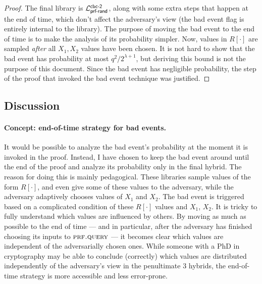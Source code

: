 \documentclass[11pt,letterpaper]{article}
\newcommand{\lib}[1]{\mathcal{L}_{\textsf{\textup{#1}}}}
\newcommand{\secpar}{\lambda}
\newcommand{\subname}[1]{\textsc{#1}}
\newcommand{\prfquery}{\subname{prf.query}}
\newcommand{\hybproof}[1]{}
\begin{document}
\begin{proof}
\hybproof{cbc-mac}

    The final library is $\lib{prf-rand}^{\textsf{cbc-2}}$, along with some extra steps that happen at the end of time, which don't affect the adversary's view (the bad event flag is entirely internal to the library).
    The purpose of moving the bad event to the end of time is to make the analysis of its probability simpler.
    Now, values in $R[\cdot]$ are sampled \emph{after} all $X_1, X_2$ values have been chosen.
    It is not hard to show that the bad event has probability at most $q^2 / 2^{\secpar+1}$, but deriving this bound is not the purpose of this document.
    Since the bad event has negligible probability, the step of the proof that invoked the bad event technique was justified.
\end{proof}

\subsection{Discussion}

\paragraph{Concept: end-of-time strategy for bad events.}
It would be possible to analyze the bad event's probability at the moment it is invoked in the proof.
Instead, I have chosen to keep the bad event around until the end of the proof and analyze its probability only in the final hybrid.
The reason for doing this is mainly pedagogical.
These libraries sample values of the form $R[\cdot]$, and even give some of these values to the adversary, while the adversary adaptively chooses values of $X_1$ and $X_2$.
The bad event is triggered based on a complicated condition of these $R[\cdot]$ values and $X_1$, $X_2$.
It is tricky to fully understand which values are influenced by others.
By moving as much as possible to the end of time --- and in particular, after the adversary has finished choosing its inputs to $\prfquery$ --- it becomes clear which values are independent of the adversarially chosen ones.
While someone with a PhD in cryptography may be able to conclude (correctly) which values are distributed independently of the adversary's view in the penultimate 3 hybrids, the end-of-time strategy is more accessible and less error-prone.
\end{document}
